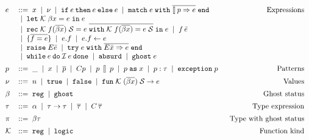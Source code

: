\documentclass{easychair}
\newcommand{\spec}{\mathcal{S}}
\newcommand{\loops}{\mathcal{I}}
\newcommand{\kind}{\mathcal{K}}
\begin{document}
\begin{figure}[h!]
  \centering
\[
  \begin{array}{llr}
    e & ::= \; x \sep \nu
        \sep \mathtt{if}\: e\: \mathtt{then}\: e\: \mathtt{else}\: e
        \sep \mathtt{match}\; e\; \mathtt{with}\;
        \overline{\talloblong\,p\Rightarrow e} \;
        \mathtt{end}
    & \alabel{Expressions}\\
      & \sep \mathtt{let} \; \kind\; \beta x = e \; \mathtt{in} \; e \\
      & \sep \mathtt{rec}\;\kind\;f(\overline{\beta x})\;\spec = e \;
        \overline{\mathtt{with}\;\kind\;f (\overline{\beta x}) = e \; \spec} \;
        \mathtt{in} \; e
        \sep f\,\expbar \\
      & \sep \{ \overline{f = e} \} \sep e.f \sep e.f \leftarrow e \\
      & \sep \mathtt{raise} \; E\expbar
        \sep \mathtt{try} \; e \; \mathtt{with} \; \exbar \; \mathtt{end} \\
      & \sep \mathtt{while} \: e \: \mathtt{do} \: \loops \: e \: \mathtt{done}
        \sep \mathtt{absurd}
        \sep \mathtt{ghost} \; e\\[.5em]

    p & ::= \; \_ \sep x \sep \overline{p} \sep C p
        \sep p\: \talloblong\: p \sep p\;\mathtt{as}\;x \sep p : \tau
        \sep \mathtt{exception}\;p & \alabel{Patterns}\\[.5em]

    \nu & ::= \; n \sep \mathtt{true} \sep \mathtt{false}
          \sep \mathtt{fun}\;\kind\; (\overline{\beta x}) \; \spec \rightarrow
          e & \alabel{Values} \\[.5em]

    \beta & ::= \; \texttt{reg} \sep \texttt{ghost} & \alabel{Ghost status}
    \\[.5em]

    \tau & ::= \; \alpha \sep \tau\rightarrow\tau \sep \overline{\tau}
           \sep C\,\overline{\tau} & \alabel{Type expression} \\[.5em]

    \pi & ::= \;\beta\tau & \hspace{-4pt}\alabel{Type with ghost status}\\[.5em]

    \kind & ::= \;\texttt{reg} \sep \texttt{logic} & \alabel{Function
                                                          kind}\\[.5em]


\end{array}\]
\end{figure}
\end{document}
